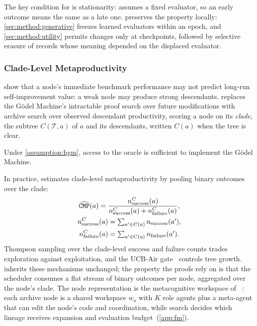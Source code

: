 The key condition for \ourmethod is stationarity: \hgm assumes a fixed evaluator, so an early outcome means the same as a late one. \ourmethod preserves the property locally: \cref{sec:method:generative} freezes learned evaluators within an epoch, and \cref{sec:method:utility} permits changes only at checkpoints, followed by selective erasure of records whose meaning depended on the displaced evaluator.

\subsubsection{Clade-Level Metaproductivity}
\label{sec:prelim:cmp}

\citet{wang2025huxley} show that a node's immediate benchmark performance may not predict long-run self-improvement value: a weak node may produce strong descendants. \hgm replaces the G\"odel Machine's intractable proof search over future modifications with archive search over observed descendant productivity, scoring a node on its \emph{clade}, the subtree $C(\mathcal{T},a)$ of $a$ and its descendants, written $C(a)$ when the tree is clear.

\begin{theorem}
\label{thm:cmp}
Under \cref{assumption:hgm}, access to the \cmp oracle is sufficient to implement the G\"odel Machine.
\end{theorem}

In practice, \hgm estimates clade-level metaproductivity by pooling binary outcomes over the clade:
\[
\begin{gathered}
\widehat{\texttt{CMP}}(a)=\frac{n_{\mathrm{success}}^C(a)}{n_{\mathrm{success}}^C(a)+n_{\mathrm{failure}}^C(a)},\\
n_{\mathrm{success}}^C(a)=\textstyle\sum_{a'\in C(a)} n_{\mathrm{success}}(a'),\\
n_{\mathrm{failure}}^C(a)=\textstyle\sum_{a'\in C(a)} n_{\mathrm{failure}}(a').
\end{gathered}
\]
Thompson sampling over the clade-level success and failure counts trades exploration against exploitation, and the UCB-Air gate~\citep{NIPS200849ae49a2} controls tree growth. \ourmethod inherits these mechanisms unchanged; the property the proofs rely on is that the scheduler consumes a flat stream of binary outcomes per node, aggregated over the node's clade. The node representation is the metacognitive workspace of \hyperagents~\citep{zhang2026hyperagents}: each archive node is a shared workspace $w_a$ with $K$ role agents plus a meta-agent that can edit the node's code and coordination, while \hgm search decides which lineage receives expansion and evaluation budget~(\cref{app:fm}).

